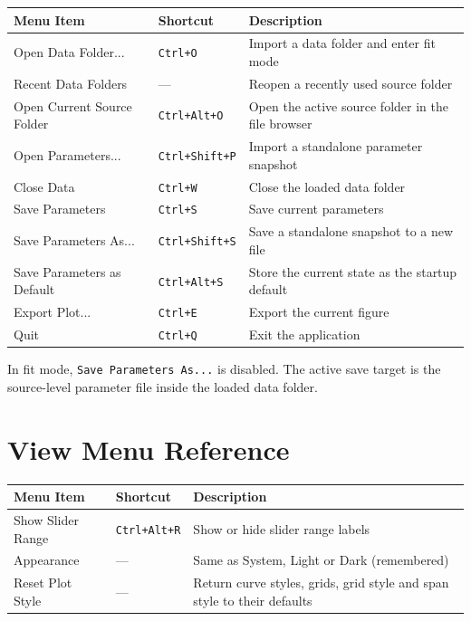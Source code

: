 \documentclass[12pt,a4paper]{article}
\newcommand{\menu}[1]{\texttt{#1}}
\newcommand{\key}[1]{\texttt{#1}}
\begin{document}
\begin{center}
\begin{tabular}{@{}lll@{}}
  \toprule
  Menu Item & Shortcut & Description \\
  \midrule
  Open Data Folder...        & \key{Ctrl+O}       & Import a data folder and enter fit mode \\
  Recent Data Folders        & ---                & Reopen a recently used source folder \\
  Open Current Source Folder & \key{Ctrl+Alt+O}   & Open the active source folder in the file browser \\
  Open Parameters...         & \key{Ctrl+Shift+P} & Import a standalone parameter snapshot \\
  Close Data                 & \key{Ctrl+W}       & Close the loaded data folder \\
  Save Parameters            & \key{Ctrl+S}       & Save current parameters \\
  Save Parameters As...      & \key{Ctrl+Shift+S} & Save a standalone snapshot to a new file \\
  Save Parameters as Default & \key{Ctrl+Alt+S}   & Store the current state as the startup default \\
  Export Plot...             & \key{Ctrl+E}       & Export the current figure \\
  Quit                       & \key{Ctrl+Q}       & Exit the application \\
  \bottomrule
\end{tabular}
\end{center}

\begin{notebox}
In fit mode, \menu{Save Parameters As...} is disabled. The active save target is the source-level parameter file
inside the loaded data folder.
\end{notebox}

\section{View Menu Reference}

\begin{center}
\begin{tabular}{@{}lll@{}}
  \toprule
  Menu Item & Shortcut & Description \\
  \midrule
  Show Slider Range & \key{Ctrl+Alt+R} & Show or hide slider range labels \\
  Appearance        & ---              & Same as System, Light or Dark (remembered) \\
  Reset Plot Style  & ---              & Return curve styles, grids, grid style and span style to their defaults \\
  \bottomrule
\end{tabular}
\end{center}
\end{document}
